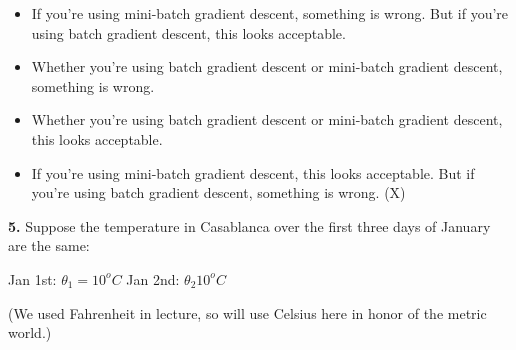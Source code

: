 \begin{itemize}
    \item If you’re using mini-batch gradient descent, something is wrong. But if you’re using batch gradient descent, this looks acceptable.
    \item Whether you’re using batch gradient descent or mini-batch gradient descent, something is wrong.
    \item Whether you’re using batch gradient descent or mini-batch gradient descent, this looks acceptable.
    \item If you’re using mini-batch gradient descent, this looks acceptable. But if you’re using batch gradient descent, something is wrong. (X)
\end{itemize}
\textbf{5.} Suppose the temperature in Casablanca over the first three days of January are the same: 

Jan 1st: $\theta_1 = 10^o C$
Jan 2nd: $\theta_2 10^o C$

(We used Fahrenheit in lecture, so will use Celsius here in honor of the metric world.)

